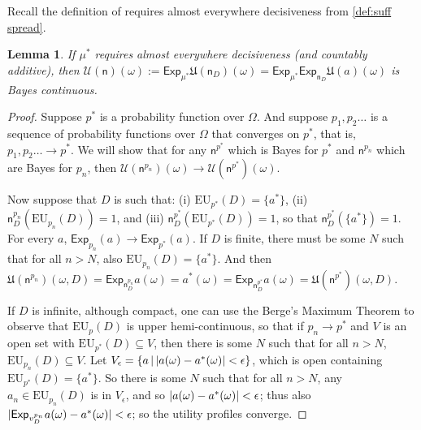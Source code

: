 \documentclass[a4paper]{article}
\newtheorem{lemma}[theorem]{Lemma}
\newcommand\Exp{\mathsf{Exp}}
\newcommand\EU{\mathrm{EU}}
\newcommand\U{\mathfrak{U}} %
\newcommand\Uwald{\mathcal{U}} %
\newcommand{\n}{\mathsf{n}}
\newcommand{\todoold}[2][]{\todo[backgroundcolor=white,bordercolor=orange!10,linecolor=gray!10, #1,caption={},textcolor=gray]{Pre-rev: #2}}
\newcommand{\todooldinfo}[2][]{\todoold[#1]{#2}}
\newcommand\SetDelimiter[1][]{
	\nonscript\,#1\vert \allowbreak \nonscript\,\mathopen{}}
\providecommand\given{\SetDelimiter}
\DeclarePairedDelimiter\abs{\lvert}{\rvert}%
\newenvironment{CCM rewritten}
{\begingroup\color{blue}} %
{\endgroup}              %
\begin{document}
Recall the definition of requires almost everywhere decisiveness from \cref{def:suff spread}.
\begin{lemma}\label{thm:cct-appln:cts}
	If ${\mu^*}$ requires almost everywhere decisiveness (and countably additive), then $\Uwald(\n)(\omega):=\Exp_{\mu^*}\U({\n_{D}})(\omega)=\Exp_{\mu^*}\Exp_{\n_D}\U(a)(\omega)$ is Bayes continuous. 
\end{lemma}
\begin{proof}
Suppose $p^*$ is a probability function over $\Omega$. And suppose $p_1,p_2\ldots$ is a sequence of probability functions over $\Omega$ that converges on $p^*$, that is, $p_1,p_2\ldots \longrightarrow p^*$. We will show that for any $\n^{p^*}$ which is Bayes for $p^*$ and $\n^{p_n}$ which are Bayes for $p_n$, then $\Uwald(\n^{p_n})(\omega)\longrightarrow\Uwald(\n^{p^*})(\omega)$. 

Now suppose that $D$ is such that: (i) $\EU_{p^*}(D)= \{a^*\}$, (ii) $\n^{p_n}_D(\EU_{p_n}(D))=1$, and (iii) $\n^{p^*}_D(\EU_{p^*}(D))=1$, so that $\n^{p^*}_D(\{a^*\}) = 1$. 
For every $a$,  $\Exp_{p_n}(a)\longrightarrow\Exp_{p^*}(a)$. If $D$ is finite, there must be some $N$ such that for all $n>N$, also $\EU_{p_n}(D)=\{a^*\}$. And then $\U(\n^{p_n})(\omega, D)=\Exp_{\n^{p_n}_D}a(\omega)=a^*(\omega)= \Exp_{\n^{p^*}_D}a(\omega) = \U(\n^{p^*})(\omega, D)$.  

If $D$ is infinite, although compact, one can use the Berge's Maximum Theorem to observe that $\EU_p(D)$ is upper hemi-continuous, so that if $p_n\longrightarrow p^*$ and $V$ is an open set with $\EU_{p^*}(D)\subseteq V$, then there is some $N$ such that for all $n>N$, $\EU_{p_n}(D)\subseteq V$. Let $V_{\epsilon}=\{a\given \abs{a(\omega)-a^*(\omega)}<\epsilon\}$, which is open containing $\EU_{p^*}(D)=\{a^*\}$. So there is some $N$ such that for all $n>N$, any $a_n\in\EU_{p_n}(D)$ is in $V_{\epsilon}$, and so $\abs{a(\omega)-a^*(\omega)}<\epsilon$; thus also $\abs{\Exp_{v_D^{p_n}} a(\omega)- a^*(\omega)}<\epsilon$; so the utility profiles converge. 



\end{proof}
\end{document}

